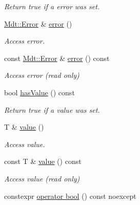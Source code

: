 \begin{DoxyCompactItemize}
\begin{DoxyCompactList}\small\item\em Return true if a error was set. \end{DoxyCompactList}\item 
\hyperlink{class_mdt_1_1_error}{Mdt\+::\+Error} \& \hyperlink{class_mdt_1_1_expected_a4e144dbc496a80e289f32f845aefcf5c}{error} ()
\begin{DoxyCompactList}\small\item\em Access error. \end{DoxyCompactList}\item 
const \hyperlink{class_mdt_1_1_error}{Mdt\+::\+Error} \& \hyperlink{class_mdt_1_1_expected_aecfcbc42443c3a2267d8d7c49e6282e8}{error} () const 
\begin{DoxyCompactList}\small\item\em Access error (read only) \end{DoxyCompactList}\item 
bool \hyperlink{class_mdt_1_1_expected_a8e75fd1c7205ad0fedac14223312c09e}{has\+Value} () const \hypertarget{class_mdt_1_1_expected_a8e75fd1c7205ad0fedac14223312c09e}{}\label{class_mdt_1_1_expected_a8e75fd1c7205ad0fedac14223312c09e}

\begin{DoxyCompactList}\small\item\em Return true if a value was set. \end{DoxyCompactList}\item 
T \& \hyperlink{class_mdt_1_1_expected_a744546093eb011f8d3964d749a3cbea3}{value} ()
\begin{DoxyCompactList}\small\item\em Access value. \end{DoxyCompactList}\item 
const T \& \hyperlink{class_mdt_1_1_expected_a290f2b4456b100e7066a453ffe7e94e8}{value} () const 
\begin{DoxyCompactList}\small\item\em Access value (read only) \end{DoxyCompactList}\item 
constexpr \hyperlink{class_mdt_1_1_expected_a4dadb05074ef02446bbbead8fd663b3f}{operator bool} () const noexcept\hypertarget{class_mdt_1_1_expected_a4dadb05074ef02446bbbead8fd663b3f}{}\label{class_mdt_1_1_expected_a4dadb05074ef02446bbbead8fd663b3f}


\end{DoxyCompactItemize}
